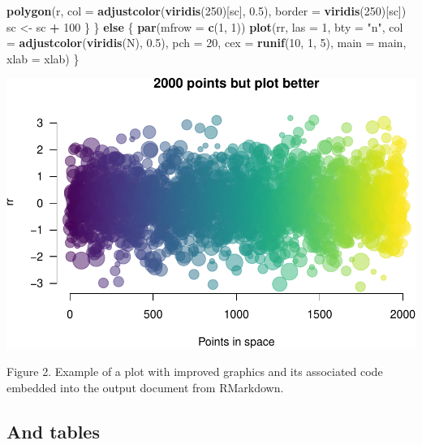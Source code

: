 \documentclass[portrait]{article}
\newenvironment{Shaded}{\begin{snugshade}}{\end{snugshade}}
\newcommand{\KeywordTok}[1]{\textcolor[rgb]{0.13,0.29,0.53}{\textbf{#1}}}
\newcommand{\DataTypeTok}[1]{\textcolor[rgb]{0.13,0.29,0.53}{#1}}
\newcommand{\DecValTok}[1]{\textcolor[rgb]{0.00,0.00,0.81}{#1}}
\newcommand{\FloatTok}[1]{\textcolor[rgb]{0.00,0.00,0.81}{#1}}
\newcommand{\StringTok}[1]{\textcolor[rgb]{0.31,0.60,0.02}{#1}}
\newcommand{\ControlFlowTok}[1]{\textcolor[rgb]{0.13,0.29,0.53}{\textbf{#1}}}
\newcommand{\OperatorTok}[1]{\textcolor[rgb]{0.81,0.36,0.00}{\textbf{#1}}}
\newcommand{\NormalTok}[1]{#1}
\begin{document}
\begin{Shaded}
\begin{Highlighting}[]
        \KeywordTok{polygon}\NormalTok{(r, }\DataTypeTok{col =} \KeywordTok{adjustcolor}\NormalTok{(}\KeywordTok{viridis}\NormalTok{(}\DecValTok{250}\NormalTok{)[sc], }\FloatTok{0.5}\NormalTok{), }\DataTypeTok{border =} \KeywordTok{viridis}\NormalTok{(}\DecValTok{250}\NormalTok{)[sc])}
\NormalTok{        sc <-}\StringTok{ }\NormalTok{sc }\OperatorTok{+}\StringTok{ }\DecValTok{100}
\NormalTok{    \}}
\NormalTok{\} }\ControlFlowTok{else}\NormalTok{ \{}
    \KeywordTok{par}\NormalTok{(}\DataTypeTok{mfrow =} \KeywordTok{c}\NormalTok{(}\DecValTok{1}\NormalTok{, }\DecValTok{1}\NormalTok{))}
    \KeywordTok{plot}\NormalTok{(rr, }\DataTypeTok{las =} \DecValTok{1}\NormalTok{, }\DataTypeTok{bty =} \StringTok{"n"}\NormalTok{, }\DataTypeTok{col =} \KeywordTok{adjustcolor}\NormalTok{(}\KeywordTok{viridis}\NormalTok{(N), }\FloatTok{0.5}\NormalTok{), }\DataTypeTok{pch =} \DecValTok{20}\NormalTok{, }\DataTypeTok{cex =} \KeywordTok{runif}\NormalTok{(}\DecValTok{10}\NormalTok{, }\DecValTok{1}\NormalTok{, }\DecValTok{5}\NormalTok{), }
        \DataTypeTok{main =}\NormalTok{ main, }\DataTypeTok{xlab =}\NormalTok{ xlab)}
\NormalTok{\}}
\end{Highlighting}
\end{Shaded}

\includegraphics{Lesson5_rmd_files/figure-latex/unnamed-chunk-2-1.pdf}

Figure 2. Example of a plot with improved graphics and its associated
code embedded into the output document from RMarkdown.

\newpage  

\subsection{And tables}\label{and-tables}
\end{document}
